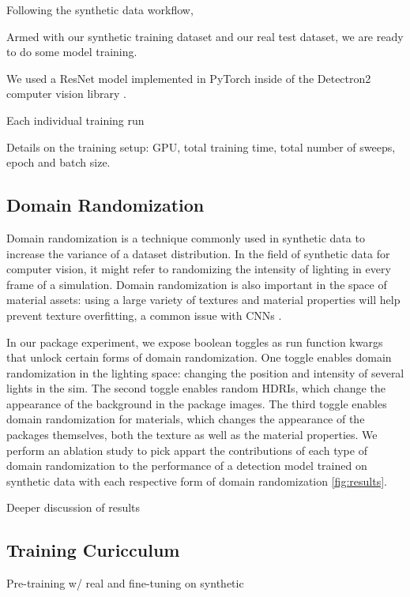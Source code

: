 \documentclass{article}
\begin{document}
Following the synthetic data workflow,

Armed with our synthetic training dataset and our real test dataset, we are ready to do some model training.

We used a ResNet model implemented in PyTorch inside of the Detectron2 computer vision library \cite{wu2019detectron2}.

Each individual training run 

Details on the training setup: GPU, total training time, total number of sweeps, epoch and batch size.


\subsection{Domain Randomization}
\label{sec:domainrandomization}

Domain randomization is a technique commonly used in synthetic data to increase the variance of a dataset distribution. In the field of synthetic data for computer vision, it might refer to randomizing the intensity of lighting in every frame of a simulation. Domain randomization is also important in the space of material assets: using a large variety of textures and material properties will help prevent texture overfitting, a common issue with CNNs \cite{DBLP:journals/corr/abs-1811-12231}. 

In our package experiment, we expose boolean toggles as run function kwargs that unlock certain forms of domain randomization. One toggle enables domain randomization in the lighting space: changing the position and intensity of several lights in the sim. The second toggle enables random HDRIs, which change the appearance of the background in the package images. The third toggle enables domain randomization for materials, which changes the appearance of the packages themselves, both the texture as well as the material properties. We perform an ablation study to pick appart the contributions of each type of domain randomization to the performance of a detection model trained on synthetic data with each respective form of domain randomization \ref{fig:results}.

Deeper discussion of results

\subsection{Training Curicculum}
\label{sec:curicculum}

Pre-training w/ real and fine-tuning on synthetic
\end{document}
